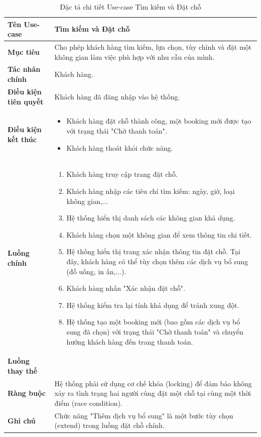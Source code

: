 \begin{table}[H]
\centering
\renewcommand{\arraystretch}{1.3}
\begin{tabular}{|p{4cm}|p{10cm}|}
\hline
\textbf{Tên Use-case} 
& Tìm kiếm và Đặt chỗ \\ 
\hline

\textbf{Mục tiêu} 
& Cho phép khách hàng tìm kiếm, lựa chọn, tùy chỉnh và đặt một không gian làm việc phù hợp với nhu cầu của mình. \\ 
\hline

\textbf{Tác nhân chính} 
& Khách hàng. \\ 
\hline

\textbf{Điều kiện tiên quyết} 
& Khách hàng đã đăng nhập vào hệ thống. \\ 
\hline

\textbf{Điều kiện kết thúc} 
& 
\begin{itemize}
\item Khách hàng đặt chỗ thành công, một booking mới được tạo với trạng thái "Chờ thanh toán".
\item Khách hàng thoát khỏi chức năng.
\end{itemize} \\ 
\hline

\textbf{Luồng chính} 
& 
\begin{enumerate}
    \item Khách hàng truy cập trang đặt chỗ.
    \item Khách hàng nhập các tiêu chí tìm kiếm: ngày, giờ, loại không gian,...
    \item Hệ thống hiển thị danh sách các không gian khả dụng.
    \item Khách hàng chọn một không gian để xem thông tin chi tiết.
    \item Hệ thống hiển thị trang xác nhận thông tin đặt chỗ. Tại đây, khách hàng có thể tùy chọn thêm các dịch vụ bổ sung (đồ uống, in ấn,...).
    \item Khách hàng nhấn "Xác nhận đặt chỗ".
    \item Hệ thống kiểm tra lại tính khả dụng để tránh xung đột.
    \item Hệ thống tạo một booking mới (bao gồm các dịch vụ bổ sung đã chọn) với trạng thái "Chờ thanh toán" và chuyển hướng khách hàng đến trang thanh toán.
\end{enumerate} \\ 
\hline

\textbf{Luồng thay thế} 
& 
 \\ 
\hline

\textbf{Ràng buộc} 
& Hệ thống phải sử dụng cơ chế khóa (locking) để đảm bảo không xảy ra tình trạng hai người cùng đặt một chỗ tại cùng một thời điểm (race condition). \\ 
\hline

\textbf{Ghi chú} 
& Chức năng "Thêm dịch vụ bổ sung" là một bước tùy chọn (extend) trong luồng đặt chỗ chính. \\ 
\hline
\end{tabular}
\caption{Đặc tả chi tiết Use-case Tìm kiếm và Đặt chỗ}
\label{tab:booking-spec}
\end{table}

